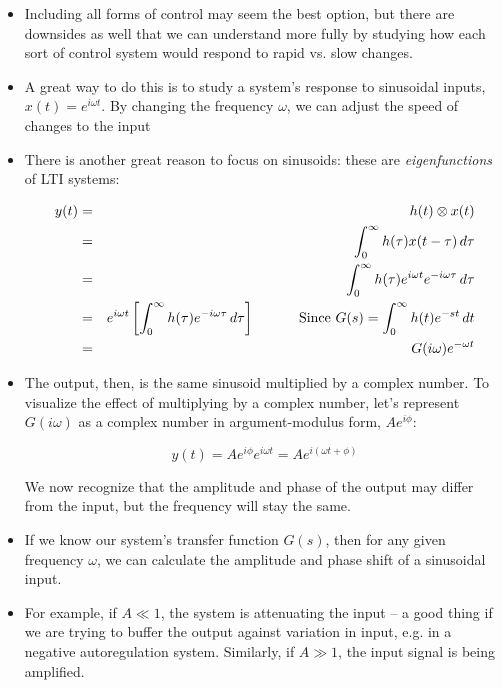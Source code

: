 \documentclass{article}
\begin{document}
\begin{itemize}

\item Including all forms of control may seem the best option, but there are downsides as well that we can understand more fully by studying how each sort of control system would respond to rapid vs. slow changes.

\item A great way to do this is to study a system's response to sinusoidal inputs, $x(t)=e^{i \omega t}$. By changing the frequency $\omega$, we can adjust the speed of changes to the input

\item There is another great reason to focus on sinusoids: these are \textit{eigenfunctions} of LTI systems:

\begin{eqnarray*}
y(t) & = & h(t) \otimes x(t)\\
& = & \int_0^{\infty} h(\tau) x(t-\tau) \, d\tau\\
& = & \int_0^{\infty}h(\tau) e^{i\omega t} e^{-i\omega \tau}\, d\tau\\
& = & e^{i\omega t}  \left[  \int_0^{\infty}h(\tau) e^{-i\omega \tau}\, d\tau \right] \hspace{1 cm} \textrm{ Since } G(s) =  \int_0^{\infty}h(t) e^{-st}\, dt \\
& = & G(i\omega) e^{-\omega t}
\end{eqnarray*}

\item The output, then, is the same sinusoid multiplied by a complex number. To visualize the effect of multiplying by a complex number, let's represent $G(i\omega)$ as a complex number in argument-modulus form, $Ae^{i\phi}$:

\[ y(t) =  Ae^{i\phi} e^{i \omega t} = A e^{i \left(\omega t + \phi\right)} \]

We now recognize that the amplitude and phase of the output may differ from the input, but the frequency will stay the same.

\item If we know our system's transfer function $G(s)$, then for any given frequency $\omega$, we can calculate the amplitude and phase shift of a sinusoidal input.

\item For example, if $A \ll 1$, the system is attenuating the input -- a good thing if we are trying to buffer the output against variation in input, e.g. in a negative autoregulation system. Similarly, if $A \gg 1$, the input signal is being amplified.


\end{itemize}
\end{document}

